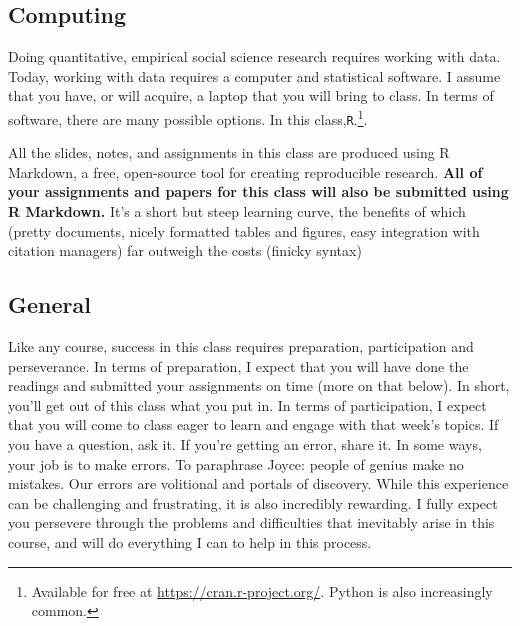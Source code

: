 \subsection{Computing}

Doing quantitative, empirical social science research requires working with data. Today, working with data requires a computer and statistical software. I assume that you have, or will acquire, a laptop that you will bring to class. In terms of software, there are many possible options. In this class,\texttt{R}.\footnote{Available for free at \url{https://cran.r-project.org/}. Python is also increasingly common.}. 

All the slides, notes, and assignments in this class are produced using R Markdown, a free, open-source tool for creating reproducible research. \textbf{All of your assignments and papers for this class will also be submitted using R Markdown.}  It's a short but steep learning curve, the benefits of which (pretty documents, nicely formatted tables and figures, easy integration with citation managers) far outweigh the costs (finicky syntax)

\subsection{General}  

Like any course, success in this class requires preparation, participation and perseverance. In terms of preparation, I expect that you will have done the readings and submitted your assignments on time (more on that below). In short, you'll get out of this class what you put in. In terms of participation, I expect that you will come to class eager to learn and engage with that week's topics. If you have a question, ask it. If you're getting an error, share it. In some ways, your job is to make errors. To paraphrase Joyce: people of genius make no mistakes. Our errors are volitional and portals of discovery. While this experience can be challenging and frustrating, it is also incredibly rewarding. I fully expect you persevere through the problems and difficulties that inevitably arise in this course, and will do everything I can to help in this process.


